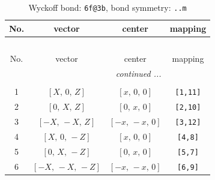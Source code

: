 \documentclass[fleqn,8pt]{jsarticle}
\begin{document}
\begin{longtable}{cccc}
\caption{Wyckoff bond: {\tt 6f@3b}, bond symmetry: {\tt ..m}}
 \\
 \hline \hline
No. & vector & center & mapping \\ \hline \endfirsthead

\multicolumn{3}{l}{\tablename\ \thetable{}} \\
 \hline \hline
No. & vector & center & mapping \\ \hline \endhead

 \hline \hline
\multicolumn{3}{r}{\footnotesize\it continued ...} \\ \endfoot

 \hline \hline
\multicolumn{3}{r}{} \\ \endlastfoot

1 & $\left[ X,\, 0,\, Z \right]$ & $\left[ x,\, 0,\, 0 \right]$ & {\tt [1,11]} \\ \hline
2 & $\left[ 0,\, X,\, Z \right]$ & $\left[ 0,\, x,\, 0 \right]$ & {\tt [2,10]} \\ \hline
3 & $\left[ - X,\, - X,\, Z \right]$ & $\left[ - x,\, - x,\, 0 \right]$ & {\tt [3,12]} \\ \hline
4 & $\left[ X,\, 0,\, - Z \right]$ & $\left[ x,\, 0,\, 0 \right]$ & {\tt [4,8]} \\ \hline
5 & $\left[ 0,\, X,\, - Z \right]$ & $\left[ 0,\, x,\, 0 \right]$ & {\tt [5,7]} \\ \hline
6 & $\left[ - X,\, - X,\, - Z \right]$ & $\left[ - x,\, - x,\, 0 \right]$ & {\tt [6,9]} \\
\end{longtable}
\renewcommand{\arraystretch}{1.2}
\end{document}
